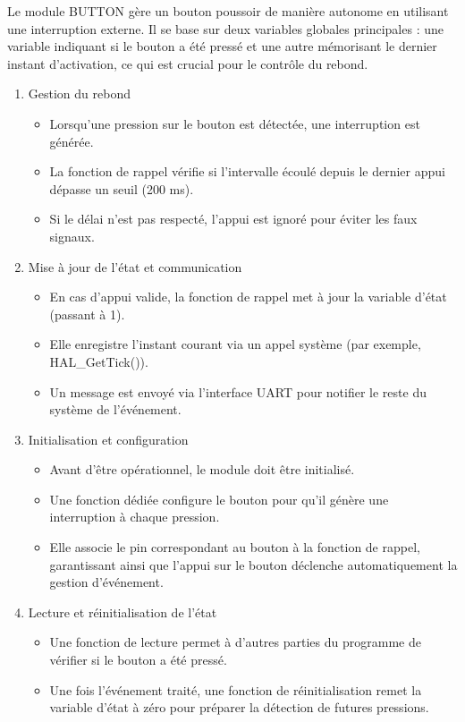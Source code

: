 Le module BUTTON gère un bouton poussoir de manière autonome en utilisant une interruption externe. Il se base sur deux variables globales principales : une variable indiquant si le bouton a été pressé et une autre mémorisant le dernier instant d’activation, ce qui est crucial pour le contrôle du rebond.

\begin{enumerate}
    \item Gestion du rebond
    \begin{itemize}
        \item Lorsqu'une pression sur le bouton est détectée, une interruption est générée.
        \item La fonction de rappel vérifie si l'intervalle écoulé depuis le dernier appui dépasse un seuil (200 ms).
        \item Si le délai n'est pas respecté, l'appui est ignoré pour éviter les faux signaux.
    \end{itemize}
    \item Mise à jour de l’état et communication
    \begin{itemize}
        \item En cas d’appui valide, la fonction de rappel met à jour la variable d’état (passant à 1).
        \item Elle enregistre l’instant courant via un appel système (par exemple, HAL\_GetTick()).
        \item Un message est envoyé via l’interface UART pour notifier le reste du système de l’événement.
    \end{itemize}
    \item Initialisation et configuration
    \begin{itemize}
        \item Avant d’être opérationnel, le module doit être initialisé.
        \item Une fonction dédiée configure le bouton pour qu’il génère une interruption à chaque pression.
        \item Elle associe le pin correspondant au bouton à la fonction de rappel, garantissant ainsi que l’appui sur le bouton déclenche automatiquement la gestion d’événement.
    \end{itemize}
    \item Lecture et réinitialisation de l’état
    \begin{itemize}
        \item Une fonction de lecture permet à d'autres parties du programme de vérifier si le bouton a été pressé.
        \item Une fois l’événement traité, une fonction de réinitialisation remet la variable d’état à zéro pour préparer la détection de futures pressions.
    \end{itemize}
\end{enumerate}
